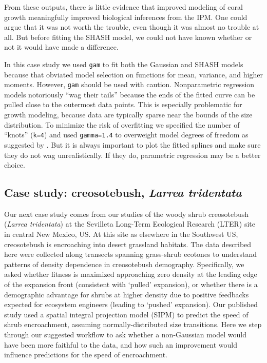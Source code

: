 \documentclass[12pt]{article}
\begin{document}
From these outputs, there is little evidence that improved modeling of coral growth meaningfully improved biological inferences from the IPM. 
One could argue that it was not worth the trouble, even though it was almost no trouble at all. But before 
fitting the SHASH model, we could not have known whether or not it would have made a difference.

In this case study we used \texttt{gam} to fit both the Gaussian and SHASH models because that obviated model selection on functions for mean, variance, and higher moments. 
However, \texttt{gam} should be used with caution. 
Nonparametric regression models notoriously ``wag their tails'' because the ends of the fitted curve can be pulled close to the outermost data points. 
This is especially problematic for growth modeling, because data are typically sparse near the bounds of the size distribution. 
To minimize the risk of overfitting we specified the number of ``knots'' (\texttt{k=4}) and used \texttt{gamma=1.4} to overweight model degrees of freedom as suggested by \citet[][sec. 3.2]{gu-2013}. 
But it is always important to plot the fitted splines and make sure they do not wag unrealistically. 
If they do, parametric regression may be a better choice. 

\subsection{Case study: creosotebush, \emph{Larrea tridentata}}
\label{sec:creosotebush}
Our next case study comes from our studies of the woody shrub creosotebush (\emph{Larrea tridentata}) at the Sevilleta Long-Term Ecological Research (LTER) site in central New Mexico, US. 
At this site as elsewhere in the Southwest US, creosotebush is encroaching into desert grassland habitats.
The data described here were collected along transects spanning grass-shrub ecotones to understand patterns of density dependence in creosotebush demography.
Specifically, we asked whether fitness is maximized approaching zero density at the leading edge of the expansion front (consistent with `pulled' expansion), or whether there is a demographic advantage for shrubs at higher density due to positive feedbacks expected for ecosystem engineers (leading to `pushed' expansion). 
Our published study \citep{drees2023demography} used a spatial integral projection model (SIPM) to predict the speed of shrub encroachment, assuming normally-distributed size transitions. 
Here we step through our suggested workflow to ask whether a non-Gaussian model would have been more faithful to the data, and how such an improvement would influence predictions for the speed of encroachment.
\end{document}
